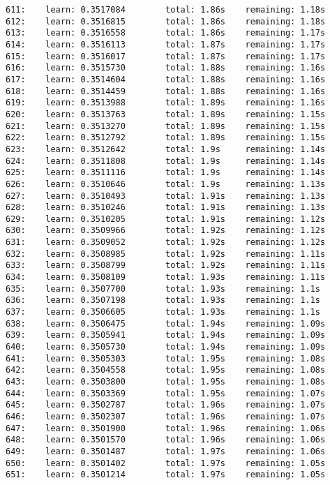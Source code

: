 \documentclass[11pt]{article}
\begin{document}
\begin{Verbatim}[commandchars=\\\{\}]
611:    learn: 0.3517084        total: 1.86s    remaining: 1.18s
612:    learn: 0.3516815        total: 1.86s    remaining: 1.18s
613:    learn: 0.3516558        total: 1.86s    remaining: 1.17s
614:    learn: 0.3516113        total: 1.87s    remaining: 1.17s
615:    learn: 0.3516017        total: 1.87s    remaining: 1.17s
616:    learn: 0.3515730        total: 1.88s    remaining: 1.16s
617:    learn: 0.3514604        total: 1.88s    remaining: 1.16s
618:    learn: 0.3514459        total: 1.88s    remaining: 1.16s
619:    learn: 0.3513988        total: 1.89s    remaining: 1.16s
620:    learn: 0.3513763        total: 1.89s    remaining: 1.15s
621:    learn: 0.3513270        total: 1.89s    remaining: 1.15s
622:    learn: 0.3512792        total: 1.89s    remaining: 1.15s
623:    learn: 0.3512642        total: 1.9s     remaining: 1.14s
624:    learn: 0.3511808        total: 1.9s     remaining: 1.14s
625:    learn: 0.3511116        total: 1.9s     remaining: 1.14s
626:    learn: 0.3510646        total: 1.9s     remaining: 1.13s
627:    learn: 0.3510493        total: 1.91s    remaining: 1.13s
628:    learn: 0.3510246        total: 1.91s    remaining: 1.13s
629:    learn: 0.3510205        total: 1.91s    remaining: 1.12s
630:    learn: 0.3509966        total: 1.92s    remaining: 1.12s
631:    learn: 0.3509052        total: 1.92s    remaining: 1.12s
632:    learn: 0.3508985        total: 1.92s    remaining: 1.11s
633:    learn: 0.3508799        total: 1.92s    remaining: 1.11s
634:    learn: 0.3508109        total: 1.93s    remaining: 1.11s
635:    learn: 0.3507700        total: 1.93s    remaining: 1.1s
636:    learn: 0.3507198        total: 1.93s    remaining: 1.1s
637:    learn: 0.3506605        total: 1.93s    remaining: 1.1s
638:    learn: 0.3506475        total: 1.94s    remaining: 1.09s
639:    learn: 0.3505941        total: 1.94s    remaining: 1.09s
640:    learn: 0.3505730        total: 1.94s    remaining: 1.09s
641:    learn: 0.3505303        total: 1.95s    remaining: 1.08s
642:    learn: 0.3504558        total: 1.95s    remaining: 1.08s
643:    learn: 0.3503800        total: 1.95s    remaining: 1.08s
644:    learn: 0.3503369        total: 1.95s    remaining: 1.07s
645:    learn: 0.3502787        total: 1.96s    remaining: 1.07s
646:    learn: 0.3502307        total: 1.96s    remaining: 1.07s
647:    learn: 0.3501900        total: 1.96s    remaining: 1.06s
648:    learn: 0.3501570        total: 1.96s    remaining: 1.06s
649:    learn: 0.3501487        total: 1.97s    remaining: 1.06s
650:    learn: 0.3501402        total: 1.97s    remaining: 1.05s
651:    learn: 0.3501214        total: 1.97s    remaining: 1.05s

\end{Verbatim}
\end{document}

